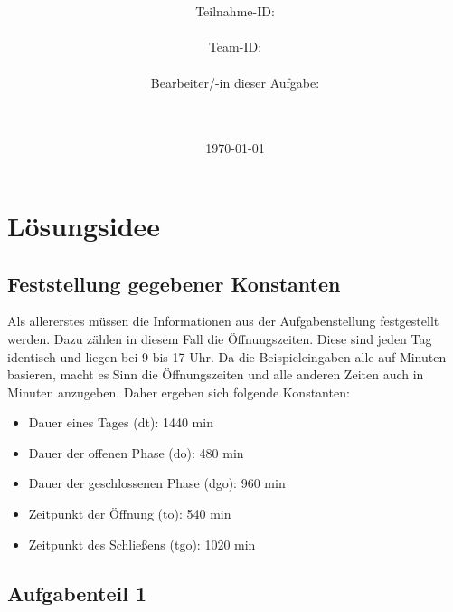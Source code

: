 \documentclass[a4paper,10pt,ngerman]{scrartcl}
\title{\textbf{\Huge\Aufgabe}}
\author{\LARGE Teilnahme-ID: \LARGE \TeilnahmeId \\\\
      \LARGE Team-ID: \LARGE \TeamId \\\\
	    \LARGE Bearbeiter/-in dieser Aufgabe: \\ 
	    \LARGE \Name\\\\}
\date{\LARGE\today}
\begin{document}
  \maketitle
  \tableofcontents
  \vspace{4cm}
  \section{Lösungsidee\label{sec:Loesungsidee}}
    \subsection{Feststellung gegebener Konstanten}
      Als allererstes müssen die Informationen aus der Aufgabenstellung festgestellt werden. Dazu zählen in diesem Fall die Öffnungszeiten. Diese sind jeden Tag identisch und liegen bei 9 bis 17 Uhr. Da die Beispieleingaben alle auf Minuten basieren, macht es Sinn die Öffnungszeiten und alle anderen Zeiten auch in Minuten anzugeben. Daher ergeben sich folgende Konstanten:
      \begin{itemize}
        \item Dauer eines Tages (dt): 1440 min
        \item Dauer der offenen Phase (do): 480 min
        \item Dauer der geschlossenen Phase (dgo): 960 min
        \item Zeitpunkt der Öffnung (to): 540 min
        \item Zeitpunkt des Schließens (tgo): 1020 min
      \end{itemize}
      
    \subsection{Aufgabenteil 1}
\end{document}
